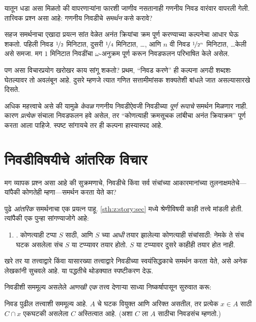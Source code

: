 यातून धडा असा मिळतो की वापरणाऱ्यांना फारशी जाणीव नसतानाही गणनीय निवड वारंवार वापरली गेली. तात्त्विक प्रश्न असा आहे: गणनीय निवडीचे \emph{समर्थन} कसे करावे?

सहज समर्थनाचा एखादा प्रयत्न सांत वेळेत अनंत क्रियांचा क्रम पूर्ण करण्याच्या कल्पनेचा आधार घेऊ शकतो. पहिली निवड $\nicefrac{1}{2}$ मिनिटात, दुसरी $\nicefrac{1}{4}$ मिनिटात, \dots, आणि $n$ वी निवड $\nicefrac{1}{2^n}$ मिनिटात, \dots\@ केली असे समजा. मग $1$ मिनिटात निवडींचा $\omega$-अनुक्रम पूर्ण करून निवडफलन परिभाषित केले असेल.

पण असा विचारप्रयोग खरोखर काय सांगू शकतो? प्रथम, “निवड करणे” ही कल्पना अगदी शब्दशः घेतल्यावर तो अवलंबून आहे. दुसरे म्हणजे त्यात गणित सत्तामीमांसक शक्यतेशी बांधले जात असल्यासारखे दिसते.

अधिक महत्त्वाचे असे की यामुळे \emph{केवळ} गणनीय निवडीऐवजी निवडीच्या \emph{पूर्ण रूपाचे} समर्थन मिळणार नाही. कारण \emph{प्रत्येक} संचाला निवडफलन हवे असेल, तर “कोणत्याही क्रमसूचक लांबीचा अनंत क्रियाक्रम” पूर्ण करता आला पाहिजे. स्पष्ट सांगायचे तर ही कल्पना हास्यास्पद आहे.







\section{निवडीविषयीचे आंतरिक विचार}\label{sth:choice:justifications:sec}

मग व्यापक प्रश्न असा आहे की सुक्रमणाचे, निवडीचे किंवा सर्व संचांच्या आकारमानांच्या तुलनाक्षमतेचे---यांपैकी कोणतेही म्हणा---समर्थन करता येते का?

पुढे \emph{आंतरिक} समर्थनाचा एक प्रयत्न पाहू. \ref{sth:z:story:sec} मध्ये श्रेणीविषयी काही तत्त्वे मांडली होती. त्यांपैकी एक पुन्हा सांगण्याजोगे आहे:
\begin{enumerate}
	\item[] \stagesacc. कोणत्याही टप्पा $S$ साठी, आणि $S$ च्या \emph{आधी} तयार झालेल्या कोणत्याही संचांसाठी: नेमके ते संच घटक असलेला संच $S$ या टप्प्यावर तयार होतो. $S$ या टप्प्यावर दुसरे काहीही तयार होत नाही.
\end{enumerate}
खरे तर या तत्त्वाद्वारे किंवा यासारख्या तत्त्वाद्वारे निवडीच्या स्वयंसिद्धकाचे समर्थन करता येते, असे अनेक लेखकांनी सुचवले आहे. या पद्धतीचे थोडक्यात स्पष्टीकरण देऊ.

निवडीशी सममूल्य असलेले \emph{आणखी एक} तत्त्व देणाऱ्या साध्या निष्कर्षापासून सुरुवात करू:

\begin{thm}[$\ZF$ मध्ये]\label{sth:choice:justifications:choiceset}
निवड पुढील तत्त्वाशी सममूल्य आहे. $A$ चे घटक वियुक्त आणि अरिक्त असतील, तर प्रत्येक $x \in A$ साठी $C
\cap x$ एकघटकी असलेला $C$ अस्तित्वात आहे. (अशा $C$ ला $A$ साठीचा {निवडसंच} म्हणतो.)
\end{thm}


